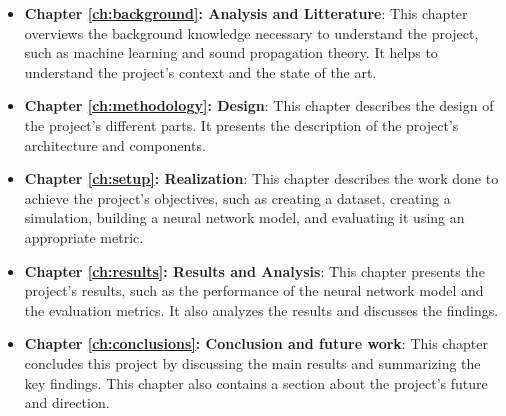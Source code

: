 \begin{itemize}
    \item \textbf{Chapter \ref{ch:background}: Analysis and Litterature}: This chapter overviews the background knowledge necessary to understand the project, such as machine learning and sound propagation theory. It helps to understand the project's context and the state of the art.
    \item \textbf{Chapter \ref{ch:methodology}: Design}: This chapter describes the design of the project's different parts. It presents the description of the project's architecture and components.
    \item \textbf{Chapter \ref{ch:setup}: Realization}: This chapter describes the work done to achieve the project's objectives, such as creating a dataset, creating a simulation, building a neural network model, and evaluating it using an appropriate metric.
    \item \textbf{Chapter \ref{ch:results}: Results and Analysis}: This chapter presents the project's results, such as the performance of the neural network model and the evaluation metrics. It also analyzes the results and discusses the findings.
    \item \textbf{Chapter \ref{ch:conclusions}: Conclusion and future work}: This chapter concludes this project by discussing the main results and summarizing the key findings. This chapter also contains a section about the project's future and direction.
\end{itemize}


